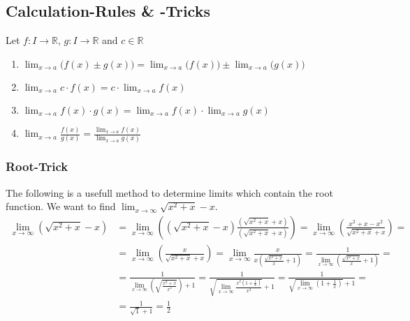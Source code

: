 \subsection{Calculation-Rules \& -Tricks}
\begin{proposition}
   Let \(f: I \to \mathbb{R}\), \(g: I \to \mathbb{R}\) and \(c \in \mathbb{R}\)
   \begin{enumerate}[label=\roman*, align=Center]
      \item \(\lim_{x \to a}\big(f(x) \pm g(x)\big) = \lim_{x \to a}\big(f(x)\big) \pm \lim_{x \to a}\big(g(x)\big)\)
      \item \(\lim_{x \to a} c \cdot f(x) = c \cdot \lim_{x \to a} f(x)\)
      \item \(\lim_{x \to a} f(x) \cdot g(x) = \lim_{x \to a} f(x) \cdot \lim_{x \to a} g(x)\)
      \item \(\lim_{x \to a} \frac{f(x)}{g(x)} = \frac{\lim_{x \to a} f(x)}{\lim_{x \to a} g(x)}\)
   \end{enumerate}
\end{proposition}

\subsubsection{Root-Trick}
The following is a usefull method to determine limits which contain the root function.
We want to find \(\lim_{x \to \infty} \sqrt{x^2 + x} - x\).
\begin{equation*}
   \begin{split}
      \lim_{x \to \infty} \left(\sqrt{x^2 + x} - x\right) & = \lim_{x \to \infty} \left(\left(\sqrt{x^2 + x} - x\right) \frac{\left(\sqrt{x^2 + x} + x\right)}{\left(\sqrt{x^2 + x} + x\right)}\right) = \lim_{x \to \infty} \left(\frac{x^2 + x - x^2}{\sqrt{x^2 + x} + x}\right) =\\
                                                          & = \lim_{x \to \infty} \left(\frac{x}{\sqrt{x^2 + x} + x}\right) = \lim_{x \to \infty} \frac{x}{x \left(\frac{\sqrt{x^2 + x}}{x} + 1\right)} = \frac{1}{\lim_{x \to \infty}\left(\frac{\sqrt{x^2 + x}}{x} + 1\right)} =\\
                                                          & = \frac{1}{\lim_{x \to \infty}\left(\sqrt{\frac{x^2 + x}{x^2}}\right) + 1} = \frac{1}{\sqrt{\lim_{x \to \infty}\frac{x^2 \left(1 + \frac{1}{x}\right)}{x^2}} + 1} = \frac{1}{\sqrt{\lim_{x \to \infty}\left(1 + \frac{1}{x}\right)} + 1} =\\
                                                          & = \frac{1}{\sqrt{1} + 1} = \frac{1}{2}
   \end{split}
\end{equation*}

